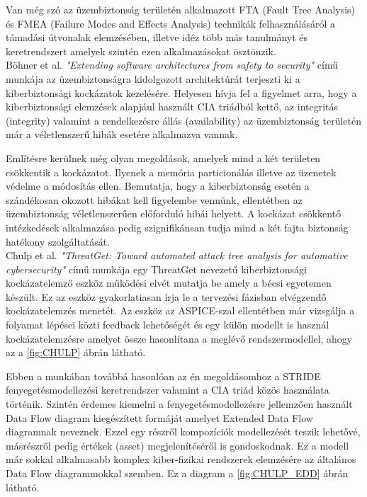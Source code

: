 Van még szó az üzembiztonság területén alkalmazott FTA (Fault Tree Analysis) és FMEA (Failure Modes and Effects Analysis) technikák felhasználásáról a támadási útvonalak elemzésében, illetve idéz több más tanulmányt és keretrendszert amelyek szintén ezen alkalmazásokat ösztönzik.\\

Böhner et al.\cite{Bohner} \textit{"Extending software architectures from safety to security"} című munkája az üzembiztonságra kidolgozott architektúrát terjeszti ki a kiberbiztonsági kockázatok kezelésére. Helyesen hívja fel a figyelmet arra, hogy a kiberbiztonsági elemzések alapjául használt CIA triádból kettő, az integritás (integrity) valamint a rendelkezésre állás (availability) az üzembiztonság területén már a véletlenszerű hibák esetére alkalmazva vannak. 

Említésre kerülnek még olyan megoldások, amelyek mind a két területen csökkentik a kockázatot. Ilyenek a memória particionálás illetve az üzenetek védelme a módosítás ellen. Bemutatja, hogy a kiberbiztonság esetén a szándékosan okozott hibákat kell figyelembe vennünk, ellentétben az üzembiztonság véletlenszerűen előforduló hibái helyett. A kockázat csökkentő intézkedések alkalmazása pedig szignifikánsan tudja mind a két fajta biztonság hatékony szolgáltatását. \\

Chulp et al.\cite{Chulp} \textit{"ThreatGet: Toward automated attack tree analysis for automative cybersecurity"} című munkája egy ThreatGet nevezetű kiberbiztonsági kockázatelemző eszköz működési elvét mutatja be amely a bécsi egyetemen készült. Ez az eszköz gyakorlatiasan írja le a tervezési fázisban elvégzendő kockázatelemzés menetét. Az eszköz az ASPICE-szal ellentétben már vizsgálja a folyamat lépései közti feedback lehetőségét és egy külön modellt is használ kockázatelemzésre amelyet össze hasonlítana a meglévő rendszermodellel, ahogy az a \ref{fig:CHULP} ábrán látható.

Ebben a munkában továbbá hasonlóan az én megoldásomhoz a STRIDE fenyegetésmodellezési keretrendszer valamint a CIA triád közös használata történik. Szintén érdemes kiemelni a fenyegetésmodellezésre jellemzően használt Data Flow diagram kiegészített formáját amelyet Extended Data Flow diagramnak neveznek. Ezzel egy részről kompozíciók modellezését teszik lehetővé, másrészről pedig értékek (asset) megjelenítéséről is gondoskodnak. Ez a modell már sokkal alkalmasabb komplex kiber-fizikai rendszerek elemzésére az általános Data Flow diagrammokkal szemben. Ez a diagram a \ref{fig:CHULP_EDD} ábrán látható.

